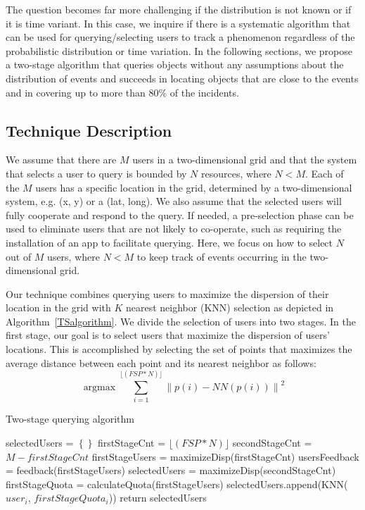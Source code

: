 \documentclass{acm_proc_article-sp}
\newcommand\floor[1]{\lfloor#1\rfloor}
\DeclareMathOperator*{\argmax}{argmax}
\newcommand{\norm}[1]{\left\lVert #1 \right\rVert}
\begin{document}
The question becomes far more challenging if the distribution is not known or if it is time variant. In this case, we inquire if there is a systematic algorithm that can be used for querying/selecting users to track a phenomenon regardless of the probabilistic distribution or time variation. In the following sections, we propose a two-stage algorithm that queries objects without any assumptions about the distribution of events and succeeds in locating objects that are close to the events and in covering up to more than $80\%$ of the incidents. \par

\subsection{Technique Description}
We assume that there are $M$ users in a two-dimensional grid and that the system that selects a user to query is bounded by $N$ resources, where $N < M$.  Each of the $M$ users has a specific location in the grid, determined by a two-dimensional system, e.g. (x, y) or a (lat, long). We also assume that the selected users will fully cooperate and respond to the query. If needed, a pre-selection phase can be used to eliminate users that are not likely to co-operate, such as requiring the installation of an app to facilitate querying. Here, we focus on how to select $N$ out of $M$ users, where $N < M$ to keep track of events occurring in the two-dimensional grid.\par

Our technique combines querying users to maximize the dispersion of their location in the grid with $K$ nearest neighbor (KNN) selection as depicted in Algorithm~\ref{TSalgorithm}. We divide the selection of users into two stages. In the first stage, our goal is to select users that maximize the dispersion of users' locations. This is accomplished by selecting the set of points that maximizes the average distance between each point and its nearest neighbor as follows:
\begin{equation} \label{eq:maxDisp}
\argmax \sum_{i=1}^{\floor{(FSP*N)}} \norm{p(i) - NN(p(i))}^2
\end{equation}
\begin{algorithm}
\caption{Two-stage querying algorithm}
\label{TSalgorithm}
 \begin{algorithmic}[1]
         \State selectedUsers = $\left\{\right\}$
         \State firstStageCnt = $\floor{(FSP*N)}$
         \State secondStageCnt = $M - firstStageCnt$
         \State firstStageUsers = maximizeDisp(firstStageCnt)
         \State usersFeedback = feedback(firstStageUsers)
                \State selectedUsers = maximizeDisp(secondStageCnt){}
         \Else
         \EndIf 
       \State firstStageQuota = calculateQuota(firstStageUsers)
     \State selectedUsers.append(KNN($user_i$, $firstStageQuota_i$))
   \EndFor
\State return {selectedUsers}
\EndFunction
\end{algorithmic}
\end{algorithm}
\end{document}
